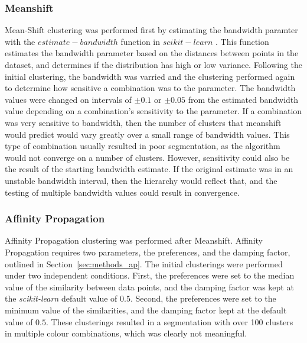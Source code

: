 \subsubsection{Meanshift}
Mean-Shift clustering was performed first by estimating the bandwidth paramter with the $estimate-bandwidth$ function in $scikit-learn$ \citep{sklearn}.
This function estimates the bandwidth parameter based on the distances between points in the dataset, and determines if the distribution has high or low variance.
Following the initial clustering, the bandwidth was varried and the clustering performed again to determine how sensitive a combination was to the parameter. 
The bandwidth values were changed on intervals of $\pm 0.1$ or $\pm 0.05$ from the estimated bandwidth value depending on a combination's sensitivity to the parameter. 
If a combination was very sensitive to bandwidth, then the number of clusters that meanshift would predict would vary greatly over a small range of bandwidth values.
This type of combination usually resulted in poor segmentation, as the algorithm would not converge on a number of clusters. 
However, sensitivity could also be the result of the starting bandwidth estimate.
If the original estimate was in an unstable bandwidth interval, then the hierarchy would reflect that, and the testing of multiple bandwidth values could result in convergence.

\subsubsection{Affinity Propagation}
Affinity Propagation clustering was performed after Meanshift.
Affinity Propagation requires two parameters, the preferences, and the damping factor, outlined in Section~\ref{sec:methods_ap}.
The initial clusterings were performed under two independent conditions.
First, the preferences were set to the median value of the similarity between data points, and the damping factor was kept at the \textit{scikit-learn} default value of $0.5$.
Second, the preferences were set to the minimum value of the similarities, and the damping factor kept at the default value of $0.5$.
These clusterings resulted in a segmentation with over 100 clusters in multiple colour combinations, which was clearly not meaningful.


